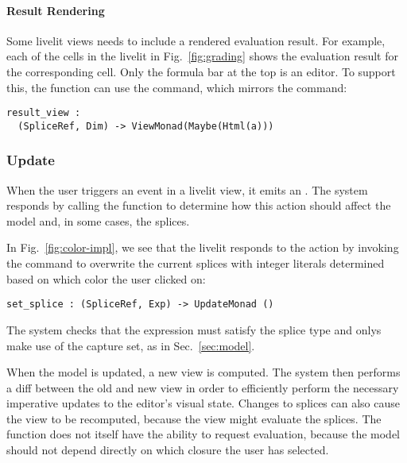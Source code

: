 \paragraph{Result Rendering}
Some livelit views needs to include 
a rendered evaluation result. For example, each of the cells in the 
livelit in Fig.~\ref{fig:grading} shows the evaluation result for the corresponding 
cell. Only the formula bar at the top is an editor. To support this, the 
function can use the  command, which mirrors the  command:
\begin{lstlisting}[numbers=none]
result_view : 
  (SpliceRef, Dim) -> ViewMonad(Maybe(Html(a)))
\end{lstlisting}


\subsubsection{Update}\label{sec:def-update}
When the user triggers an event in a livelit view, it emits an .
The system responds by calling the  function to determine how 
this action should affect the model and, in some cases, the splices. 


In Fig.~\ref{fig:color-impl}, we see that the  livelit responds to 
the  action by invoking the  command to overwrite 
the current splices with integer literals determined based on which color the user
clicked on:
\begin{lstlisting}[numbers=none]
  set_splice : (SpliceRef, Exp) -> UpdateMonad ()
\end{lstlisting}
The system checks that the expression must satisfy the splice type 
and onlys make use of the capture set, as in Sec.~\ref{sec:model}.

When the model is updated, a new view is 
computed. The system then performs a diff between the old and new view in order to 
efficiently perform the necessary imperative updates to the editor's visual state.
Changes to splices can also cause the view to be recomputed, because the view might 
evaluate the splices. The  function does not itself 
have the ability to request evaluation, because the model should not depend directly  
on which closure the user has selected. 

